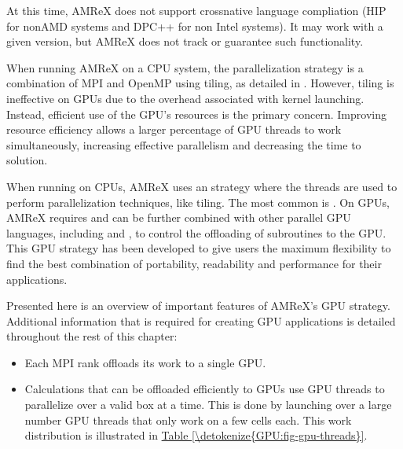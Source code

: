 \documentclass[letterpaper,10pt,english]{sphinxmanual}
\begin{document}
\sphinxAtStartPar
At this time, AMReX does not support cross\sphinxhyphen{}native language compliation
(HIP for non\sphinxhyphen{}AMD systems and DPC++ for non Intel systems).  It may work with
a given version, but AMReX does not track or guarantee such functionality.

\sphinxAtStartPar
When running AMReX on a CPU system, the parallelization strategy is a
combination of MPI and OpenMP using tiling, as detailed in
{\hyperref[\detokenize{Basics:sec-basics-mfiter-tiling}]{}}. However, tiling is ineffective on GPUs
due to the overhead associated with kernel launching.  Instead,
efficient use of the GPU’s resources is the primary concern.  Improving
resource efficiency allows a larger percentage of GPU threads to work
simultaneously, increasing effective parallelism and decreasing the time
to solution.

\sphinxAtStartPar
When running on CPUs, AMReX uses an  strategy where the 
threads are used to perform parallelization techniques, like tiling.
The most common  is .  On GPUs, AMReX requires 
and can be further combined with other parallel GPU languages, including
 and , to control the offloading of subroutines
to the GPU.  This  GPU strategy has been developed
to give users the maximum flexibility to find the best combination of
portability, readability and performance for their applications.

\sphinxAtStartPar
Presented here is an overview of important features of AMReX’s GPU strategy.
Additional information that is required for creating GPU applications is
detailed throughout the rest of this chapter:
\begin{itemize}
\item {} 
\sphinxAtStartPar
Each MPI rank offloads its work to a single GPU. 

\item {} 
\sphinxAtStartPar
Calculations that can be offloaded efficiently to GPUs use GPU threads
to parallelize over a valid box at a time.  This is done by launching over
a large number GPU threads that only work on a few cells each. This work
distribution is illustrated in \hyperref[\detokenize{GPU:fig-gpu-threads}]{Table \ref{\detokenize{GPU:fig-gpu-threads}}}.

\end{itemize}
\end{document}
